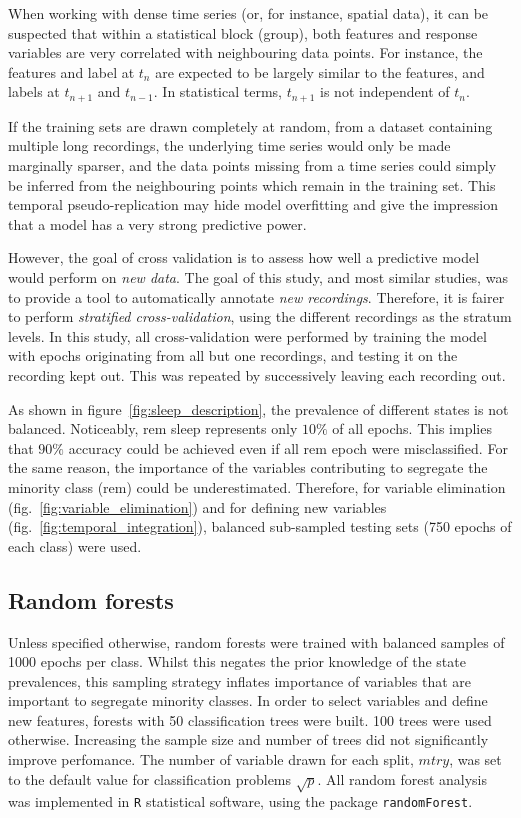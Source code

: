 When working with dense time series (or, for instance, spatial data), it can be suspected that within a statistical block (group),
both features and response variables are very correlated with neighbouring data points.
For instance, the features and label at $t_n$ are expected to be largely similar to the features, and labels at $t_{n+1}$ and $t_{n-1}$.
In statistical terms, $t_{n+1}$ is not independent of $t_{n}$.

If the training sets are drawn completely at random, from a dataset containing multiple long recordings,
the underlying time series would only be made marginally sparser, and the data points missing from
a time series could simply be inferred from the neighbouring points which remain in the training set.
This temporal pseudo-replication may hide model overfitting and give the impression that a model has a very strong predictive power.

However, the goal of cross validation is to assess how well a predictive model would perform on \emph{new data}.
The goal of this study, and most similar studies, was to provide a tool to automatically annotate \emph{new recordings}.
Therefore, it is fairer to perform \emph{stratified cross-validation}, using the different recordings as the stratum levels.
In this study, all cross-validation were performed by training the model with epochs originating from all but one recordings,
and testing it on the recording kept out. This was repeated by successively leaving each recording out.

As shown in figure~\ref{fig:sleep_description}, the prevalence of different states is not balanced. Noticeably, \gls{rem} sleep represents only $10\%$ of all epochs.
This implies that $90\%$ accuracy could be achieved even if all \gls{rem} epoch were misclassified.
For the same reason, the importance of the variables contributing to segregate the minority class (\gls{rem}) could be underestimated.
Therefore, for variable elimination (fig.~\ref{fig:variable_elimination}) and for defining new variables (fig.~\ref{fig:temporal_integration}),
balanced sub-sampled testing sets (750 epochs of each class) were used.

\subsection{Random forests}
Unless specified otherwise, random forests \citationneeded{} were trained with balanced samples of 1000 epochs per class.
Whilst this negates the prior knowledge of the state prevalences, this sampling strategy 
inflates importance of variables that are important to segregate minority classes.
In order to select variables and define new features, forests with 50 classification trees were built. 100 trees were used otherwise.
Increasing the sample size and number of trees did not significantly improve perfomance.
The number of variable drawn for each split, $mtry$, was set to the default value  for classification problems $\sqrt{p}$.
All random forest analysis was implemented in \texttt{R}\citationneeded{} statistical software, using the package \texttt{randomForest}.

